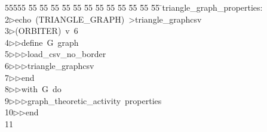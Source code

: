 %
%
\begin{tabbing}
55555 \= 55 \= 55 \= 55 \= 55 \= 55 \= 55 \= 55 \= 55 \= 55 \= 55 \= 55 \= 55 \= \>triangle\_graph\_properties:\\[0pt]
2\>$\triangleright$\>echo\ (TRIANGLE\_GRAPH)\ {\textgreater}triangle\_graphcsv\\[0pt]
3\>$\triangleright$\>(ORBITER)\ v\ 6\ \\[0pt]
4\>$\triangleright$\>$\triangleright$\>define\ G\ graph\ \\[0pt]
5\>$\triangleright$\>$\triangleright$\>$\triangleright$\>load\_csv\_no\_border\ \\[0pt]
6\>$\triangleright$\>$\triangleright$\>$\triangleright$\>triangle\_graphcsv\ \\[0pt]
7\>$\triangleright$\>$\triangleright$\>end\ \\[0pt]
8\>$\triangleright$\>$\triangleright$\>with\ G\ do\ \\[0pt]
9\>$\triangleright$\>$\triangleright$\>$\triangleright$\>graph\_theoretic\_activity\ properties\ \\[0pt]
10\>$\triangleright$\>$\triangleright$\>end\\[0pt]
11\>\end{tabbing}
